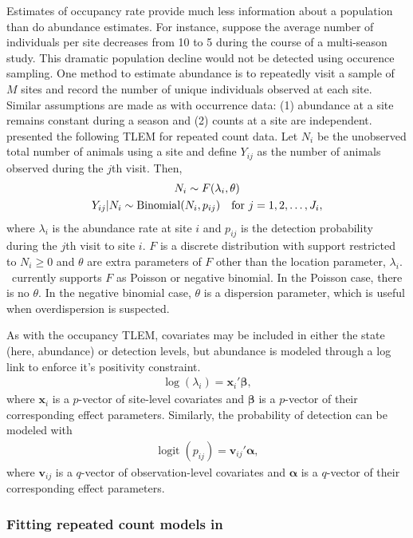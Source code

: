 \documentclass[article,shortnames]{jss}
\DeclareMathOperator{\logit}{logit}
\DeclareMathOperator{\Bin}{Binomial}
\newcommand{\um}{\pkg{unmarked}}
\begin{document}
Estimates of occupancy rate provide much less information about a
population than do abundance estimates. For instance, suppose the
average number of individuals per site decreases from 10 to 5 during
the course of a multi-season study. This dramatic population decline
would not be detected using occurence sampling.  One method to
estimate abundance is to repeatedly visit a sample of $M$ sites and
record the number of unique individuals observed at each site.
Similar assumptions are made as with occurrence data: (1) abundance at
a site remains constant during a season and (2) counts at a site are
independent.  \citet{Royle2004} presented the following TLEM for
repeated count data.  Let $N_i$ be the unobserved total number of
animals using a site and define $Y_{ij}$ as the number of animals observed
during the $j$th visit.  Then,
\begin{gather}
  N_i \sim F(\lambda_i, \theta) \label{eq:pc2} \\
  Y_{ij}|N_{i} \sim \Bin(N_i, p_{ij})\text{\quad for $j=1,2,\dots,J_{i}$},
\end{gather}
where $\lambda_i$ is the abundance rate at site $i$ and $p_{ij}$ is
the detection probability during the $j$th visit to site $i$.  $F$ is
a discrete distribution with support restricted to $N_{i} \ge 0$ and
$\theta$ are extra parameters of $F$ other than the location
parameter, $\lambda_{i}$.  \um\ currently supports $F$ as Poisson or
negative binomial.  In the Poisson case, there is no $\theta$.  In the
negative binomial case, $\theta$ is a dispersion parameter, which is
useful when overdispersion is suspected.

As with the occupancy TLEM, covariates may be included in either the
state (here, abundance) or detection levels, but abundance is modeled
through a log link to enforce it's positivity constraint.
\begin{gather}
  \log(\lambda_i) = \mathbf x_i' \mathbf \beta,
\end{gather}
where $\mathbf x_i$ is a $p$-vector of site-level covariates and $\mathbf \beta$
is a $p$-vector of their corresponding effect parameters.  Similarly, the
probability of detection can be modeled with
\begin{gather}
  \logit(p_{ij}) = \mathbf v_{ij}' \mathbf \alpha,
\end{gather}
where $\mathbf v_{ij}$ is a $q$-vector of observation-level covariates and
$\mathbf \alpha$ is a $q$-vector of their corresponding effect parameters.

\subsubsection[Fitting repeated count models in unmarked]{Fitting repeated count models in \um}
\end{document}
